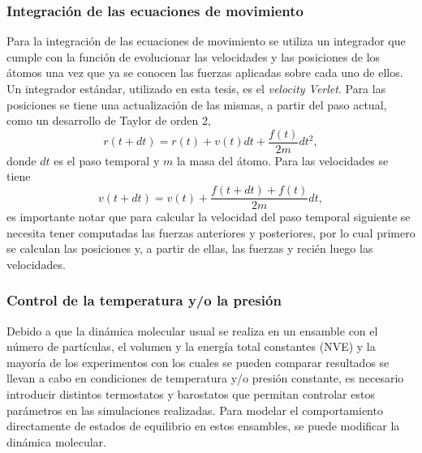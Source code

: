 \subsubsection{Integración de las ecuaciones de movimiento}

Para la integración de las ecuaciones de movimiento se utiliza un integrador que 
cumple con la función de evolucionar las velocidades y las posiciones de los 
átomos una vez que ya se conocen las fuerzas aplicadas sobre cada uno de ellos.
Un integrador estándar, utilizado en esta tesis, es el \textit{velocity Verlet}. 
Para las posiciones se tiene una actualización de las mismas, a partir
del paso actual, como un desarrollo de Taylor de orden 2,
\begin{equation}
    r(t+dt) = r(t) + v(t) dt + \frac{f(t)}{2m} dt^2,
\end{equation}
donde $dt$ es el paso temporal y $m$ la masa del átomo. Para las velocidades se
tiene
\begin{equation}
    v(t+dt) = v(t) + \frac{f(t+dt)+f(t)}{2m} dt,
\end{equation}
es importante notar que para calcular la velocidad del paso temporal siguiente se
necesita tener computadas las fuerzas anteriores y posteriores, por lo cual
primero se calculan las posiciones y, a partir de ellas, las fuerzas y recién 
luego las velocidades. %


\subsubsection{Control de la temperatura y/o la presión}

Debido a que la dinámica molecular usual se realiza en un ensamble con el número 
de partículas, el volumen y la energía total constantes (NVE) y la mayoría de los
experimentos con los cuales se pueden comparar resultados se llevan a cabo en 
condiciones de temperatura y/o presión constante, es necesario introducir 
distintos termostatos y barostatos que permitan controlar estos parámetros en las 
simulaciones realizadas. Para modelar el comportamiento directamente de estados
de equilibrio en estos ensambles, se puede modificar la dinámica molecular. %

